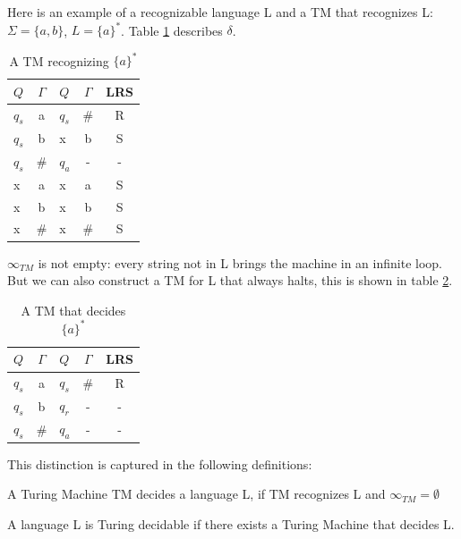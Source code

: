 Here is an example of a recognizable language L and a TM that
recognizes L: $\Sigma = \{a,b\}$, $L = \{a\}^*$. Table \ref{turing3}
describes $\delta$.

\begin{table}[ht]
\center
\begin{tabular}{|l|c||l|c|c|}
\hline
$Q$    & $\Gamma$   &  $Q$  &  $\Gamma$ &  LRS \\ \hline
$q_s$  &  a         &  $q_s$&   \#      &  R   \\
$q_s$  &  b         &  x    &    b      &  S   \\
$q_s$  &  \#        &  $q_a$&    -      &  -   \\
x      &  a         &  x    &    a      &  S   \\
x      &  b         &  x    &    b      &  S   \\
x      &  \#        &  x    &    \#     &  S   \\
\hline
\end{tabular}
\caption{A TM recognizing $\{a\}^*$} \label{turing3}
\end{table}
$\infty_{TM}$ is not empty: every string not in L brings the machine
in an infinite loop. But we can also construct a TM for L that always
halts, this is shown in table \ref{turing4}.

\begin{table}[ht]
\center
\begin{tabular}{|l|c||l|c|c|}
\hline
$Q$    & $\Gamma$   &  $Q$  &  $\Gamma$ &  LRS \\ \hline
$q_s$  &  a         &  $q_s$&   \#      &  R   \\
$q_s$  &  b         &  $q_r$&    -      &  -   \\
$q_s$  &  \#        &  $q_a$&    -      &  -   \\
\hline
\end{tabular}
\caption{A TM that decides $\{a\}^*$} \label{turing4}
\end{table}

This distinction is captured in the following definitions:

\begin{definition}[To decide]
A Turing Machine TM decides a language L, if TM recognizes L and
$\infty_{TM} = \emptyset$
\end{definition}

\begin{definition}
A language L is Turing decidable if there exists a Turing Machine that
decides L.
\end{definition}

